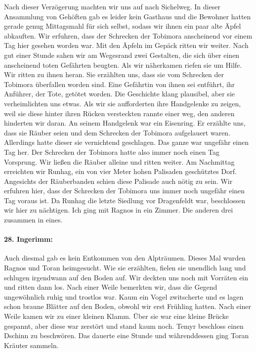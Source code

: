 Nach dieser Verzögerung machten wir uns auf nach Sichelweg. In dieser Ansammlung von Gehöften gab es leider kein Gasthaus und die Bewohner hatten gerade genug Mittagsmahl für sich selbst, sodass wir ihnen ein paar alte Äpfel abkauften. Wir erfuhren, dass der Schrecken der Tobimora anscheinend vor einem Tag hier gesehen worden war. Mit den Äpfeln im Gepäck ritten wir weiter. Nach gut einer Stunde sahen wir am Wegesrand zwei Gestalten, die sich über einen anscheinend toten Gefährten beugten. Als wir näherkamen riefen sie um Hilfe. Wir ritten zu ihnen heran. Sie erzählten uns, dass sie vom Schrecken der Tobimora überfallen worden sind. Eine Gefährtin von ihnen sei entführt, ihr Anführer, der Tote, getötet worden. Die Geschichte klang plausibel, aber sie verheimlichten uns etwas. Als wir sie aufforderten ihre Handgelenke zu zeigen, weil sie diese hinter ihren Rücken versteckten rannte einer weg, den anderen hinderten wir daran. An seinem Handgelenk war ein Eisenring. Er erzählte uns, dass sie Räuber seien und dem Schrecken der Tobimora aufgelauert waren. Allerdings hatte dieser sie vernichtend geschlagen. Das ganze war ungefähr einen Tag her. Der Schrecken der Tobimora hatte also immer noch einen Tag Vorsprung. Wir ließen die Räuber alleine und ritten weiter. Am Nachmittag erreichten wir Runhag, ein von vier Meter hohen Palisaden geschütztes Dorf. Angesichts der Räuberbanden schien diese Palisade auch nötig zu sein. Wir erfuhren hier, dass der Schrecken der Tobimora uns immer noch ungefähr einen Tag voraus ist. Da Runhag die letzte Siedlung vor Dragenfeldt  war, beschlossen wir hier zu nächtigen. Ich ging mit Ragnos in ein Zimmer. Die anderen drei zusammen in eines.

\paragraph{28. Ingerimm:}
Auch diesmal gab es kein Entkommen von den Alpträumen. Dieses Mal wurden Ragnos und Toran heimgesucht. Wie sie erzählten, fielen sie unendlich lang und schlugen irgendwann auf den Boden auf. Wir deckten uns noch mit Vorräten ein und ritten dann los. Nach einer Weile bemerkten wir, dass die Gegend ungewöhnlich ruhig und trostlos war. Kaum ein Vogel zwitscherte und es lagen schon braune Blätter auf den Boden, obwohl wir erst Frühling hatten. Nach einer Weile kamen wir zu einer kleinen Klamm. Über sie war eine kleine Brücke gespannt, aber diese war zerstört und stand kaum noch. Temyr beschloss einen Dschinn zu beschwören. Das dauerte eine Stunde und währenddessen ging Toran Kräuter sammeln.


